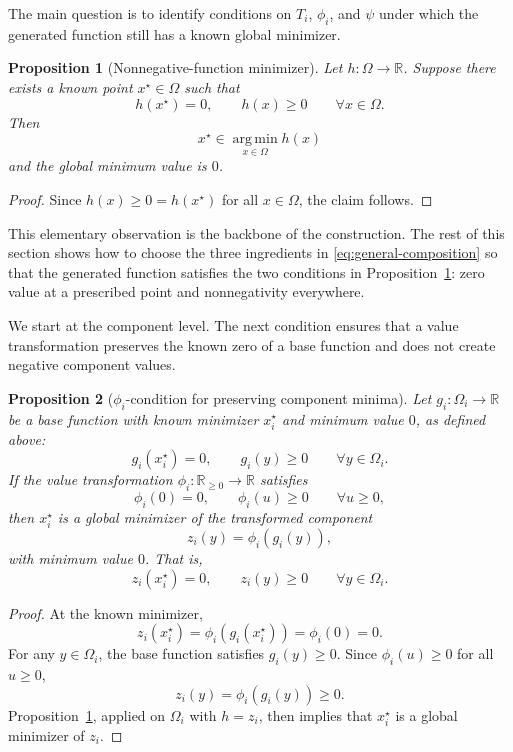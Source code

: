 \documentclass[journal]{IEEEtran}
\theoremstyle{remark}
\theoremstyle{plain}
\newtheorem{proposition}{Proposition}
\begin{document}
The main question is to identify conditions on $T_i$, $\phi_i$, and $\psi$
under which the generated function still has a known global minimizer.




\begin{proposition}[Nonnegative-function minimizer]
	\label{f_helper}
	Let \(h:\Omega\to\mathbb{R}\). Suppose there exists a known point
	\(x^\star\in\Omega\) such that
	\[
	h(x^\star)=0, \qquad
	h(x)\ge0
	\qquad
	\forall x\in\Omega.
	\]
	Then
	\[
	x^\star\in\operatorname*{arg\,min}_{x\in\Omega} h(x)
	\]
	and the global minimum value is \(0\).
\end{proposition}

\begin{proof}
	Since \(h(x)\ge0=h(x^\star)\) for all \(x\in\Omega\), the claim follows.
\end{proof}

This elementary observation is the backbone of the construction. The rest of
this section shows how to choose the three ingredients in
\eqref{eq:general-composition} so that the generated function satisfies the two
conditions in Proposition~\ref{f_helper}: zero value at a prescribed point and
nonnegativity everywhere.

We start at the component level. The next condition ensures that a value
transformation preserves the known zero of a base function and does not create
negative component values.

\begin{proposition}[\(\phi_i\)-condition for preserving component minima]
	\label{prop:minimum-preserving-value-transformations}
	Let \(g_i:\Omega_i\to\mathbb{R}\) be a base function with known minimizer
	\(x_i^\star\) and minimum value \(0\), as defined above:
	\[
	g_i(x_i^\star)=0,
	\qquad
	g_i(y)\ge0
	\qquad
	\forall y\in\Omega_i.
	\]
	If the value transformation \(\phi_i:\mathbb{R}_{\ge0}\to\mathbb{R}\)
	satisfies
	\[
	\phi_i(0)=0,
	\qquad
	\phi_i(u)\ge0
	\qquad
	\forall u\ge0,
	\]
	then \(x_i^\star\) is a global minimizer of the transformed component
	\[
	z_i(y)=\phi_i(g_i(y)),
	\]
	with minimum value \(0\). That is,
	\[
	z_i(x_i^\star)=0,
	\qquad
	z_i(y)\ge0
	\qquad
	\forall y\in\Omega_i.
	\]
\end{proposition}

\begin{proof}
	At the known minimizer,
	\[
	z_i(x_i^\star)
	=
	\phi_i(g_i(x_i^\star))
	=
	\phi_i(0)
	=
	0.
	\]
	For any \(y\in\Omega_i\), the base function satisfies
	\(g_i(y)\ge0\). Since \(\phi_i(u)\ge0\) for all \(u\ge0\),
	\[
	z_i(y)
	=
	\phi_i(g_i(y))
	\ge0.
	\]
	Proposition~\ref{f_helper}, applied on \(\Omega_i\) with \(h=z_i\), then
	implies that \(x_i^\star\) is a global minimizer of \(z_i\).
\end{proof}
\end{document}

